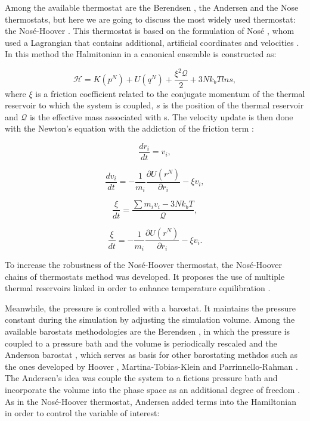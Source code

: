 Among the available thermostat are the Berendsen \cite{doi:10.1063/1.448118}, the Andersen \cite{1980JChPh722384A} and the Nose \cite{1984JChPh81511N} thermostats, but here we are going to discuss the most widely used thermostat: the Nosé-Hoover \cite{PhysRevA.31.1695}. This thermostat is based on the formulation of Nosé \cite{1984JChPh81511N}, whom used a Lagrangian that contains additional, artificial coordinates and velocities \cite{frenkel}. In this method the Halmitonian in a canonical ensemble is constructed as:

\begin{equation}
\mathcal{H} =  K(p^{N}) + U(q^{N})  + \frac{\xi ^{2} \mathcal{Q}}{2} + 3Nk_{b}T ln s ,
\end{equation}
where $\xi$ is a friction coefficient related to the conjugate momentum of the thermal reservoir to which the system is coupled, $s$ is the position of the thermal reservoir and $\mathcal{Q}$ is the effective mass associated with s. The velocity update is then done with the Newton's equation with the addiction of the friction term \cite{shell2015}:

\begin{equation}
\frac{dr_{i}}{dt} = v_{i},
\end{equation}

\begin{equation}
\frac{dv_{i}}{dt} = - \frac{1}{m_{i}} \frac{\partial U (r^{N})}{\partial r_{i}} - \xi v_{i},
\end{equation}

\begin{equation}
\frac{\xi}{dt} = \frac{\sum m_{i} v_{i} - 3Nk_{b}T}{\mathcal{Q}} ,
\end{equation}

\begin{equation}
\frac{\xi}{dt} = - \frac{1}{m_{i}} \frac{\partial U (r^{N})}{\partial r_{i}} - \xi v_{i}.
\end{equation}

To increase the robustness of the Nosé-Hoover thermostat, the Nosé-Hoover chains of thermostats method was developed. It proposes the use of multiple thermal reservoirs linked in order to enhance temperature equilibration \cite{shell2015}.  

Meanwhile, the pressure is controlled with a barostat. It maintains the pressure constant during the simulation by adjusting the simulation volume. Among the available  barostats methodologies are the Berendsen \cite{doi:10.1063/1.448118}, in which the pressure is coupled to a pressure bath and the volume is periodically rescaled and the Anderson barostat \cite{1980JChPh722384A}, which serves as basis for other barostating methdos such as the ones developed by Hoover \cite{PhysRevA.31.1695}, Martina-Tobias-Klein \cite{doi:10.1063/1.467468} and Parrinnello-Rahman \cite{doi:10.1063/1.328693}. The Andersen's idea was couple the system to a fictions pressure bath and  incorporate the volume into the phase space as an additional degree of freedom \cite{tuckerman}. As in the Nosé-Hoover thermostat, Andersen added terms into the Hamiltonian in order to control the variable of interest:

